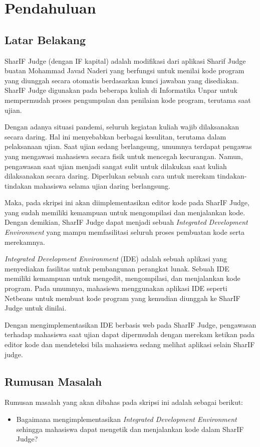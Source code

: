 \chapter{Pendahuluan}
\label{chap:intro}
   
\section{Latar Belakang}
\label{sec:label}

SharIF Judge (dengan IF kapital) adalah modifikasi dari aplikasi Sharif Judge buatan Mohammad Javad Naderi yang berfungsi untuk menilai kode program yang diunggah secara otomatis berdasarkan kunci jawaban yang disediakan. SharIF Judge digunakan pada beberapa kuliah di Informatika Unpar untuk mempermudah proses pengumpulan dan penilaian kode program, terutama saat ujian.

Dengan adanya situasi pandemi, seluruh kegiatan kuliah wajib dilaksanakan secara daring. Hal ini menyebabkan berbagai kesulitan, terutama dalam pelaksanaan ujian. Saat ujian sedang berlangsung, umumnya terdapat pengawas yang mengawasi mahasiswa secara fisik untuk mencegah kecurangan. Namun, pengawasan saat ujian menjadi sangat sulit untuk dilakukan saat kuliah dilaksanakan secara daring. Diperlukan sebuah cara untuk merekam tindakan-tindakan mahasiswa selama ujian daring berlangsung. 

Maka, pada skripsi ini akan diimplementasikan editor kode pada SharIF Judge, yang sudah memiliki kemampuan untuk mengompilasi dan menjalankan kode. Dengan demikian, SharIF Judge dapat menjadi sebuah {\it Integrated Development Environment} yang mampu memfasilitasi seluruh proses pembuatan kode serta merekamnya.

{\it Integrated Development Environment} (IDE) adalah sebuah aplikasi yang menyediakan fasilitas untuk pembangunan perangkat lunak. Sebuah IDE memiliki kemampuan untuk mengedit, mengompilasi, dan menjalankan kode program. Pada umumnya, mahasiswa menggunakan aplikasi IDE seperti Netbeans untuk membuat kode program yang kemudian diunggah ke SharIF Judge untuk dinilai.

Dengan mengimplementasikan IDE berbasis web pada SharIF Judge, pengawasan terhadap mahasiswa saat ujian dapat dipermudah dengan merekam ketikan pada editor kode dan mendeteksi bila mahasiswa sedang melihat aplikasi selain SharIF judge.


\section{Rumusan Masalah}
\label{sec:rumusan}
Rumusan masalah yang akan dibahas pada skripsi ini adalah sebagai berikut:
\begin{itemize}
	\item Bagaimana mengimplementasikan {\it Integrated Development Environment} sehingga mahasiswa dapat mengetik dan menjalankan kode dalam SharIF Judge?
\end{itemize}


